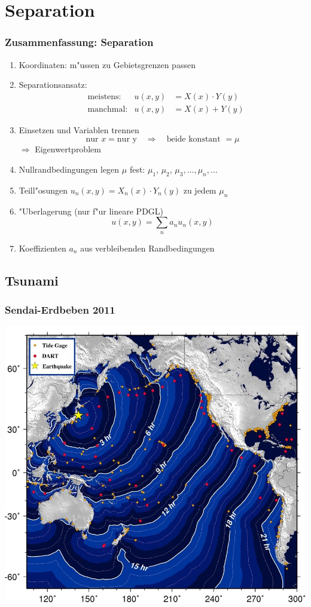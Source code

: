 %
% 
\section{Separation}

\begin{frame}
\frametitle{Zusammenfassung: Separation}
\begin{enumerate}
\item Koordinaten: m"ussen zu Gebietsgrenzen passen
\item Separationsansatz: 
\begin{align*}
&\text{meistens:}&u(x,y)&=X(x)\cdot Y(y)\\
&\text{manchmal:}&u(x,y)&=X(x)+Y(y)
\end{align*}
\item Einsetzen und Variablen trennen
\[
\text{nur $x$} = \text{nur y}\quad\Rightarrow\quad \text{beide konstant $=\mu$}
\]
$\Rightarrow$ Eigenwertproblem
\item Nullrandbedingungen legen $\mu$ fest: $\mu_1$, $\mu_2$,
$\mu_3,\dots,\mu_n,\dots$
\item Teill"osungen $u_n(x,y)=X_n(x)\cdot Y_n(y)$  zu jedem $\mu_n$
\item "Uberlagerung (nur f"ur lineare PDGL)
\[
u(x,y)=\sum_n a_nu_n(x,y)
\]
\item Koeffizienten $a_n$ aus verbleibenden Randbedingungen
\end{enumerate}
\end{frame}

\begin{frame}
\section{Tsunami}
\frametitle{Sendai-Erdbeben 2011}
\begin{center}
\includegraphics[width=0.85\hsize]{../../common/graphics/sendainoaa.jpg}
\end{center}
\end{frame}


